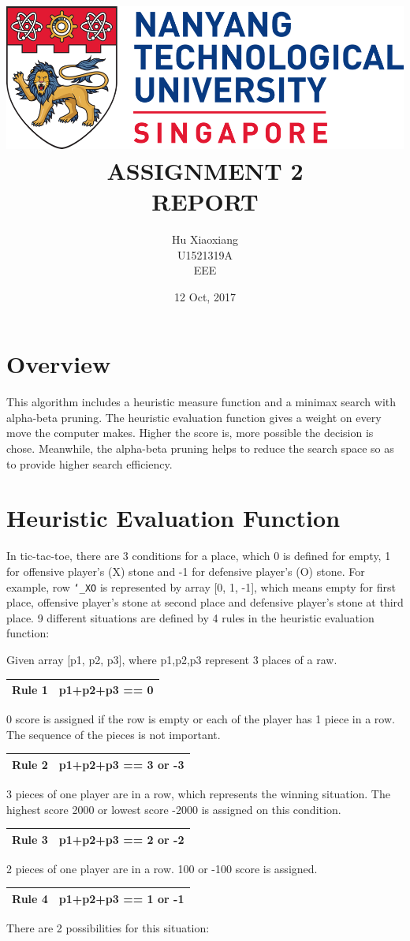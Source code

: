 \documentclass[titlepage]{article}
\author{Hu Xiaoxiang \\
U1521319A \\
EEE \\
}
\date{12 Oct, 2017 \\
}
\title{\includegraphics[width=\textwidth]{logo_ntu_new.png} \\
[5\baselineskip] ASSIGNMENT 2 \\
REPORT \\
[5\baselineskip]}
\begin{document}
\maketitle
\tableofcontents

\newpage
{}

\section{Overview}
\label{sec:org227d42f}
This algorithm includes a heuristic measure function and a minimax search with
alpha-beta pruning. The heuristic evaluation function gives a weight on every
move the computer makes. Higher the score is, more possible the decision is
chose. Meanwhile, the alpha-beta pruning helps to reduce the search space so
as to provide higher search efficiency.

\section{Heuristic Evaluation Function}
\label{sec:org4726084}
In tic-tac-toe, there are 3 conditions for a place, which 0 is defined for
empty, 1 for offensive player's (X) stone and -1 for defensive player's (O)
stone. For example, row \texttt{\char`_XO} is represented by array [0, 1, -1], which means
empty for first place, offensive player's stone at second place and defensive
player's stone at third place. 9 different situations are defined by 4 rules
in the heuristic evaluation function:

Given array [p1, p2, p3], where p1,p2,p3 represent 3 places of a raw. 
\begin{center}
\begin{tabular}{ll}
\hline
Rule 1 & p1+p2+p3 == 0\\
\hline
\end{tabular}
\end{center}
0 score is assigned if the row is empty or each of the player has 1 piece in a
row. The sequence of the pieces is not important.
\begin{center}
\begin{tabular}{ll}
\hline
Rule 2 & p1+p2+p3 == 3 or -3\\
\hline
\end{tabular}
\end{center}
3 pieces of one player are in a row, which represents the winning situation.
The highest score 2000 or lowest score -2000 is assigned on this condition.
\begin{center}
\begin{tabular}{ll}
\hline
Rule 3 & p1+p2+p3 == 2 or -2\\
\hline
\end{tabular}
\end{center}
2 pieces of one player are in a row. 100 or -100 score is assigned. 
\begin{center}
\begin{tabular}{ll}
\hline
Rule 4 & p1+p2+p3 == 1 or -1\\
\hline
\end{tabular}
\end{center}
There are 2 possibilities for this situation: 
\end{document}
